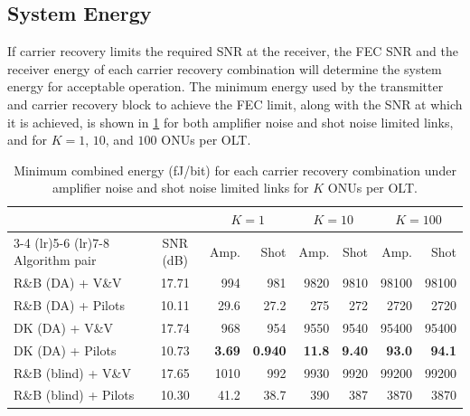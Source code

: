 \documentclass[12pt,a4paper]{article}
\begin{document}
\subsection{System Energy}
If carrier recovery limits the required SNR at the receiver, the FEC SNR and the receiver energy of each carrier recovery combination will determine the system energy for acceptable operation. The minimum energy used by the transmitter and carrier recovery block to achieve the FEC limit, along with the SNR at which it is achieved, is shown in \cref{tab:sys_energy} for both amplifier noise and shot noise limited links, and for $K = 1$, $10$, and $100$ ONUs per OLT. 
\begin{table}[H]
    \centering
    \small
    \begin{tabular}{lc rr rr rr}
        \toprule
        & & \multicolumn{2}{c}{$K = 1$} & \multicolumn{2}{c}{$K = 10$} & \multicolumn{2}{c}{$K = 100$} \\
        \cmidrule(lr){3-4} \cmidrule(lr){5-6} \cmidrule(lr){7-8}
        Algorithm pair & SNR (dB) & Amp. & Shot & Amp. & Shot & Amp. & Shot \\
        \midrule
        R\&B (DA) + V\&V      & 17.71 & 994   & 981   & 9820  & 9810  & 98100 & 98100 \\
        R\&B (DA) + Pilots    & 10.11 & 29.6  & 27.2  & 275   & 272   & 2720  & 2720  \\
        DK (DA) + V\&V        & 17.74 & 968   & 954   & 9550  & 9540  & 95400 & 95400 \\
        DK (DA) + Pilots & 10.73 & \textbf{3.69}  & \textbf{0.940} & \textbf{11.8}  & \textbf{9.40}  & \textbf{93.0}  & \textbf{94.1}  \\
        R\&B (blind) + V\&V   & 17.65 & 1010  & 992   & 9930  & 9920  & 99200 & 99200 \\
        R\&B (blind) + Pilots & 10.30 & 41.2  & 38.7  & 390   & 387   & 3870  & 3870  \\
        \bottomrule
    \end{tabular}
    \caption{Minimum combined energy (fJ/bit) for each carrier recovery combination under amplifier noise and shot noise limited links for $K$ ONUs per OLT.}
    \label{tab:sys_energy}
\end{table}

\printbibliography
\end{document}
